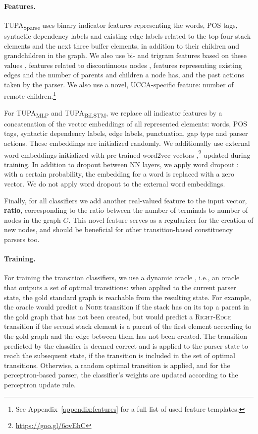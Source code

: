 \documentclass[11pt,a4paper]{article}
\newcommand{\parser}[1]{TUPA\textsubscript{#1}}
\begin{document}
\paragraph{Features.}
\parser{Sparse} uses binary indicator features representing
the words, POS tags, syntactic dependency labels and
existing edge labels related to the top four stack elements and the 
next three buffer elements, in addition to their children and grandchildren in the graph.
We also use bi- and trigram features based on these values \cite{zhang2009transition,zhu2013fast},
features related to discontinuous nodes
\cite[including separating punctuation and gap type]{maier2015discontinuous},
features representing existing edges and the number of parents and children a node has,
and the past actions taken by the parser.
We also use a novel, UCCA-specific feature:
number of remote children.\footnote{See
Appendix~\ref{appendix:features} for a full list of used feature templates.}

For \parser{MLP} and \parser{BiLSTM},
we replace all indicator features by a
concatenation of the vector embeddings of all represented elements:
words, POS tags, syntactic dependency labels, edge labels, punctuation, gap type and parser actions.
These embeddings are initialized randomly.
We additionally use external word embeddings initialized with
pre-trained word2vec vectors \cite{mikolov2013efficient},\footnote{\url{
https://goo.gl/6ovEhC}} updated during training.
In addition to dropout between NN layers, we apply word dropout 
\cite{kiperwasser2016simple}: with a certain probability, the embedding for a
word is replaced with a zero vector. We do not apply word dropout to the external
word embeddings.

Finally, for all classifiers we add another real-valued feature to the input vector,
\textbf{ratio}, corresponding to the ratio between the number of terminals to number of nodes
in the graph $G$.
This novel feature serves as a regularizer for the creation of new nodes,
and should be beneficial for other transition-based constituency parsers too.

\paragraph{Training.}
For training the transition classifiers, we use a dynamic oracle \cite{goldberg2012dynamic},
i.e., an oracle that outputs a set of optimal transitions: when
applied to the current parser state, the gold
standard graph is reachable from the resulting state.
For example, the oracle would predict a \textsc{Node} transition if the stack 
has on its top a parent in the gold graph that has not been created,
but would predict a \textsc{Right-Edge} transition if the second stack
element is a parent of the
first element according to the gold graph and the edge between them has not been created.
The transition predicted by the classifier is deemed correct
and is applied to the parser state to reach the subsequent state,
if the transition is included in the set of optimal transitions.
Otherwise, a random optimal transition is applied,
and for the perceptron-based parser, the classifier's weights are updated according
to the perceptron update rule.
\end{document}
